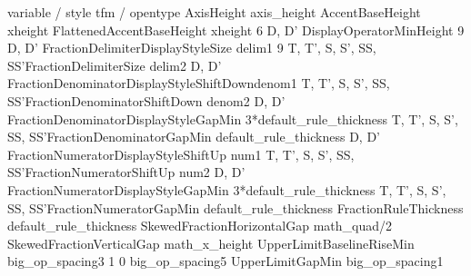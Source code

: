 \starttabulate[|l|l|]
\FL
\BC variable / style \BC tfm / opentype \NC \NR
\TL
\MathLine{\Umathaxis}                     {}   {}                     {AxisHeight}                              {axis_height}
\MathLine{\Umathaccentbaseheight}         {}   {}                     {AccentBaseHeight}                        {xheight}
\MathLine{\Umathflattenedaccentbaseheight}{}   {}                     {FlattenedAccentBaseHeight}               {xheight}
\MathLine{\Umathoperatorsize}             {6}  {D, D'}                {DisplayOperatorMinHeight}                {\emdash}
\MathLine{\Umathfractiondelsize}          {9}  {D, D'}                {FractionDelimiterDisplayStyleSize}       {delim1}
\MathLine{\Umathfractiondelsize}          {9}  {T, T', S, S', SS, SS'}{FractionDelimiterSize}                   {delim2}
\MathLine{\Umathfractiondenomdown}        {}   {D, D'}                {FractionDenominatorDisplayStyleShiftDown}{denom1}
\MathLine{\Umathfractiondenomdown}        {}   {T, T', S, S', SS, SS'}{FractionDenominatorShiftDown}            {denom2}
\MathLine{\Umathfractiondenomvgap}        {}   {D, D'}                {FractionDenominatorDisplayStyleGapMin}   {3*default_rule_thickness}
\MathLine{\Umathfractiondenomvgap}        {}   {T, T', S, S', SS, SS'}{FractionDenominatorGapMin}               {default_rule_thickness}
\MathLine{\Umathfractionnumup}            {}   {D, D'}                {FractionNumeratorDisplayStyleShiftUp}    {num1}
\MathLine{\Umathfractionnumup}            {}   {T, T', S, S', SS, SS'}{FractionNumeratorShiftUp}                {num2}
\MathLine{\Umathfractionnumvgap}          {}   {D, D'}                {FractionNumeratorDisplayStyleGapMin}     {3*default_rule_thickness}
\MathLine{\Umathfractionnumvgap}          {}   {T, T', S, S', SS, SS'}{FractionNumeratorGapMin}                 {default_rule_thickness}
\MathLine{\Umathfractionrule}             {}   {}                     {FractionRuleThickness}                   {default_rule_thickness}
\MathLine{\Umathskewedfractionhgap}       {}   {}                     {SkewedFractionHorizontalGap}             {math_quad/2}
\MathLine{\Umathskewedfractionvgap}       {}   {}                     {SkewedFractionVerticalGap}               {math_x_height}
\MathLine{\Umathlimitabovebgap}           {}   {}                     {UpperLimitBaselineRiseMin}               {big_op_spacing3}
\MathLine{\Umathlimitabovekern}           {1}  {}                     {0}                                       {big_op_spacing5}
\MathLine{\Umathlimitabovevgap}           {}   {}                     {UpperLimitGapMin}                        {big_op_spacing1}
